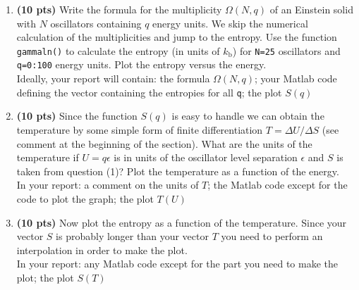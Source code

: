 \documentclass[11pt]{article}
\begin{document}
\begin{enumerate}[resume]
\item \textbf{(10 pts)} Write the formula for the multiplicity $\Omega(N,q)$ of an Einstein solid with $N$ oscillators containing $q$ energy units. We skip the numerical calculation of the multiplicities and jump to the entropy. Use the function \verb|gammaln()| to calculate the entropy (in units of $k_\mathrm{b}$) for \verb|N=25| oscillators and \verb|q=0:100| energy units. Plot the entropy versus the energy.\\
Ideally, your report will contain: the formula $\Omega(N,q)$; your Matlab code defining the vector containing the entropies for all \verb|q|; the plot $S(q)$

\item \textbf{(10 pts)} Since the function $S(q)$ is easy to handle we can obtain the temperature  by some simple form of finite differentiation $T=\Delta U/\Delta S$ (see comment at the beginning of the section). What are the units of the temperature if $U=q\epsilon$ is in units of the oscillator level separation $\epsilon$ and $S$ is taken from question (1)? Plot the temperature as a function of the energy.\\
In your report: a comment on the units of $T$; the Matlab code except for the code to plot the graph; the plot $T(U)$

\item \textbf{(10 pts)} Now plot the entropy as a function of the temperature. Since your vector $S$ is probably longer than your vector $T$ you need to perform an interpolation in order to make the plot.\\
In your report: any Matlab code except for the part you need to make the plot; the plot $S(T)$


\end{enumerate}
\end{document}
